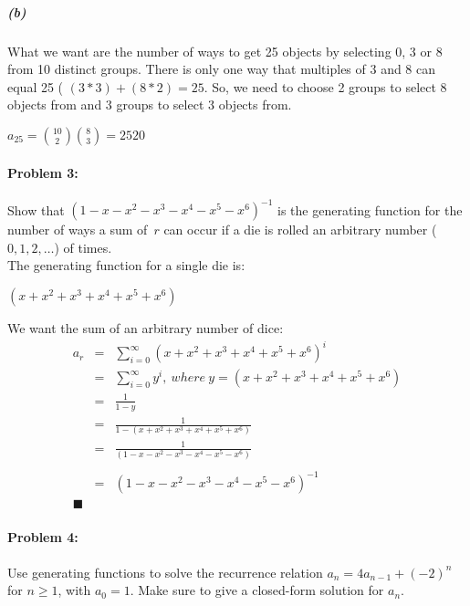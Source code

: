 \documentclass{article}
\begin{document}
\subparagraph{(b)} { What we want are the number of ways to get 25 objects by selecting 0, 3 or 8 from 10 distinct groups. There is only one way that multiples of 3 and 8 can equal 25 ( ${ ( 3 * 3 ) + ( 8 * 2 ) = 25 }$. So, we need to choose 2 groups to select 8 objects from and 3 groups to select 3 objects from. \\

\begin{center}
  ${ \boxed { a_{25} = {10 \choose 2}  {8 \choose 3}  = 2520 } }$ \\
\end{center}

\paragraph{Problem 3:} Show that $(1-x-x^2-x^3-x^4-x^5-x^6)^{-1}$ is
the generating function for the number of ways a sum of~$r$ can occur
if a die is rolled an arbitrary number ($0,1,2,\ldots$) of times. \\

The generating function for a single die is: \\
\begin{center}
  ${ ( x + x^2 + x^3 + x^4 + x^5 + x^6 ) }$\\
\end{center}

We want the sum of an arbitrary number of dice: \\
\begin{eqnarray*}
 a_r  & = &  \sum_{i=0}^{\infty} ( x + x^2 + x^3 + x^4 + x^5 + x^6 )^i \\
      & = &  \sum_{i=0}^{\infty} y^i,\ where \  y = ( x + x^2 + x^3 + x^4 + x^5 + x^6 ) \\
      & = &  \frac{1}{1 - y} \\
      & = &  \frac{1}{1 - ( x + x^2 + x^3 + x^4 + x^5 + x^6 ) }\\
      & = &  \frac{1}{(1 - x - x^2 - x^3 - x^4 - x^5 - x^6 ) }  \\ \\
      & = &  (1 - x - x^2 - x^3 - x^4 - x^5 - x^6 )^{-1}  \\
      \blacksquare
\end{eqnarray*}


\paragraph{Problem 4:} Use generating functions to solve the
recurrence relation $a_n = 4a_{n-1} + (-2)^n$ for $n \geq 1$, with
$a_0=1$.  Make sure to give a closed-form solution for $a_n$.  \\

}
\end{document}
